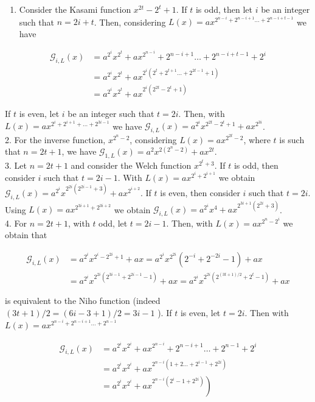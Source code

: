 \documentclass[10pt]{article}
\begin{document}
\begin{enumerate}
  \item Consider the Kasami function $x^{2 t}-2^{t}+1$. If $t$ is odd, then let $i$ be an integer such that $n=2 i+t$. Then, considering $L(x)=a x^{2^{n-i}+2^{n-i+1} \ldots+2^{n-i+t-1}}$ we have
\end{enumerate}

$$
\begin{aligned}
\mathscr{G}_{i, L}(x) & =a^{2^{i}} x^{2^{t}}+a x^{2^{n-i}}+2^{n-i+1} \ldots+2^{n-i+t-1}+2^{i} \\
& =a^{2^{i}} x^{2^{t}}+a x^{2^{i}\left(2^{t}+2^{t+1} \ldots+2^{2 t-1}+1\right)} \\
& =a^{2^{i}} x^{2^{t}}+a x^{2^{i}\left(2^{2 t}-2^{t}+1\right)}
\end{aligned}
$$

If $t$ is even, let $i$ be an integer such that $t=2 i$. Then, with $L(x)=a x^{2^{i}+2^{i+1}+\ldots+2^{3 i-1}}$ we have $\mathscr{G}_{i, L}(x)=a^{2^{i}} x^{2^{2 t}-2^{t}+1}+a x^{2^{3 i}}$.\\
2. For the inverse function, $x^{2^{n}-2}$, considering $L(x)=a x^{2^{2 t}-2}$, where $t$ is such that $n=2 t+1$, we have $\mathscr{G}_{1, L}(x)=a^{2} x^{2\left(2^{n}-2\right)}+a x^{2 t}$.\\
3. Let $n=2 t+1$ and consider the Welch function $x^{2^{t}+3}$. If $t$ is odd, then consider $i$ such that $t=2 i-1$. With $L(x)=a x^{2^{i}+2^{i+1}}$ we obtain $\mathscr{G}_{i, L}(x)=a^{2^{i}} x^{2^{2 i}\left(2^{2 i-1}+3\right)}+ a x^{2^{i+2}}$. If $t$ is even, then consider $i$ such that $t=2 i$. Using $L(x)=a x^{2^{3 i+1}+2^{3 i+2}}$ we obtain $\mathscr{G}_{i, L}(x)=a^{2^{i}} x^{4}+a x^{2^{3 i+1}\left(2^{2 i}+3\right)}$.\\
4. For $n=2 t+1$, with $t$ odd, let $t=2 i-1$. Then, with $L(x)=a x^{2^{n}-2^{i}}$ we obtain that

$$
\begin{aligned}
\mathscr{G}_{i, L}(x) & =a^{2^{i}} x^{2^{i}-2^{2 i}+1}+a x=a^{2^{i}} x^{2^{2 i}}\left(2^{-i}+2^{-2 i}-1\right)+a x \\
& =a^{2^{i}} x^{2^{2 i}\left(2^{3 i-1}+2^{2 i-1}-1\right)}+a x=a^{2^{i}} x^{2^{2 i}\left(2^{(3 t+1) / 2}+2^{t}-1\right)}+a x
\end{aligned}
$$

is equivalent to the Niho function (indeed $(3 t+1) / 2=(6 i-3+1) / 2=3 i-1$ ). If $t$ is even, let $t=2 i$. Then with $L(x)=a x^{2^{n-i}+2^{n-i+1} \ldots+2^{n-1}}$

$$
\begin{aligned}
\mathscr{G}_{i, L}(x) & =a^{2^{i}} x^{2^{i}}+a x^{2^{n-i}}+2^{n-i+1} \ldots+2^{n-1}+2^{i} \\
& =a^{2^{i}} x^{2^{i}}+a x^{2^{n-i}\left(1+2 \ldots+2^{i-1}+2^{2 i}\right)} \\
& \left.=a^{2^{i}} x^{2^{i}}+a x^{2^{n-i}\left(2^{i}-1+2^{2 i}\right)}\right)
\end{aligned}
$$
\end{document}
